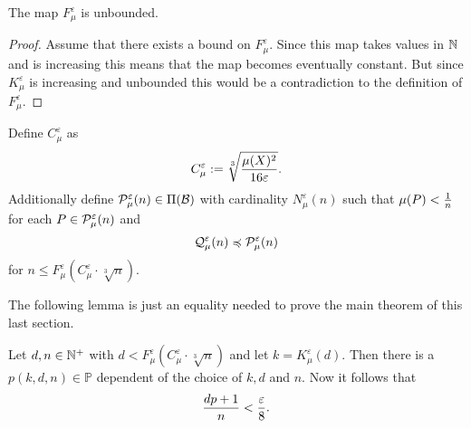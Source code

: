\begin{lemma}
  The map $F_\mu^\varepsilon$ is unbounded.
\end{lemma}

\begin{proof}
  Assume that there exists a bound on $F_\mu^\varepsilon$. Since this map takes values in $\N$ and is increasing this means that the map becomes eventually constant. But since $K_\mu^\varepsilon$ is increasing and unbounded this would be a contradiction to the definition of $F_\mu^\varepsilon$.
\end{proof}

\begin{defin}
  Define $C_\mu^\varepsilon$ as \[C_\mu^\varepsilon := \sqrt[3]{\mu(X)^2 \over 16\varepsilon}.\]
  Additionally define $\P^\varepsilon_\mu(n) \in \Pi(\mathcal{B})$ with cardinality $N_\mu^\varepsilon(n)$ such that $\mu(P) < {1 \over n}$ for each $P \in \P_\mu^\varepsilon(n)$ and \[\Q_\mu^\varepsilon(n) \preccurlyeq \P^\varepsilon_\mu(n)\] for $n \leq F_\mu^\varepsilon(C_\mu^\varepsilon \cdot \sqrt[3]{n})$. 
\end{defin}

The following lemma is just an equality needed to prove the main theorem of this last section.
\begin{lemma}\label{lem:approxK}
  Let $d,n \in \N^+$ with $d < F_\mu^\varepsilon(C_\mu^\varepsilon \cdot \sqrt[3]{n})$ and let $k = K_\mu^\varepsilon(d)$. Then there is a $p(k,d,n) \in \mathbb{P}$ dependent of the choice of $k, d$ and $n$. Now it follows that \[{dp +1 \over n} < {\varepsilon \over 8}.\]
\end{lemma}

